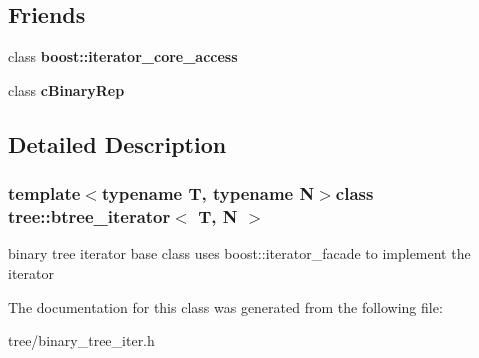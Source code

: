 \subsection*{Friends}
\begin{DoxyCompactItemize}
\item 
\hypertarget{classtree_1_1btree__iterator_ac09f73e325921cc50ebcd96bed0f8096}{class {\bfseries boost\-::iterator\-\_\-core\-\_\-access}}\label{classtree_1_1btree__iterator_ac09f73e325921cc50ebcd96bed0f8096}

\item 
\hypertarget{classtree_1_1btree__iterator_a3bb2150f15bc37d06135e1e488e81e77}{class {\bfseries c\-Binary\-Rep}}\label{classtree_1_1btree__iterator_a3bb2150f15bc37d06135e1e488e81e77}

\end{DoxyCompactItemize}


\subsection{Detailed Description}
\subsubsection*{template$<$typename T, typename N$>$class tree\-::btree\-\_\-iterator$<$ T, N $>$}

binary tree iterator base class uses boost\-::iterator\-\_\-facade to implement the iterator 

The documentation for this class was generated from the following file\-:\begin{DoxyCompactItemize}
\item 
tree/binary\-\_\-tree\-\_\-iter.\-h\end{DoxyCompactItemize}
